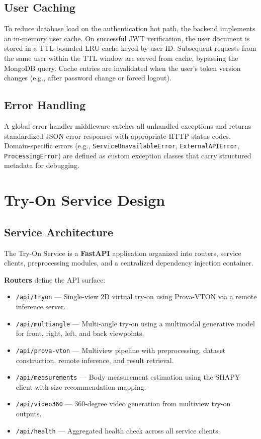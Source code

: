 \subsection{User Caching}
To reduce database load on the authentication hot path, the backend implements an in-memory user cache. On successful JWT verification, the user document is stored in a TTL-bounded LRU cache keyed by user ID. Subsequent requests from the same user within the TTL window are served from cache, bypassing the MongoDB query. Cache entries are invalidated when the user's token version changes (e.g., after password change or forced logout).

\subsection{Error Handling}
A global error handler middleware catches all unhandled exceptions and returns standardized JSON error responses with appropriate HTTP status codes. Domain-specific errors (e.g., \texttt{ServiceUnavailableError}, \texttt{ExternalAPIError}, \texttt{ProcessingError}) are defined as custom exception classes that carry structured metadata for debugging.

\section{Try-On Service Design}

\subsection{Service Architecture}
The Try-On Service is a \textbf{FastAPI} application organized into routers, service clients, preprocessing modules, and a centralized dependency injection container.

\textbf{Routers} define the API surface:
\begin{itemize}[leftmargin=*]
    \item \texttt{/api/tryon} — Single-view 2D virtual try-on using Prova-VTON via a remote inference server.
    \item \texttt{/api/multiangle} — Multi-angle try-on using a multimodal generative model for front, right, left, and back viewpoints.
    \item \texttt{/api/prova-vton} — Multiview pipeline with preprocessing, dataset construction, remote inference, and result retrieval.
    \item \texttt{/api/measurements} — Body measurement estimation using the SHAPY client with size recommendation mapping.
    \item \texttt{/api/video360} — 360-degree video generation from multiview try-on outputs.
    \item \texttt{/api/health} — Aggregated health check across all service clients.
\end{itemize}

